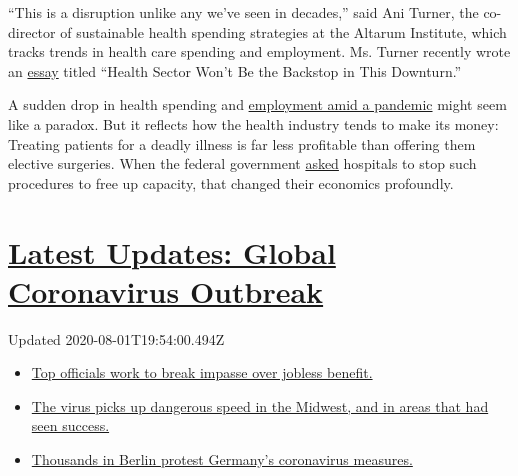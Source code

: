 ``This is a disruption unlike any we've seen in decades,'' said Ani
Turner, the co-director of sustainable health spending strategies at the
Altarum Institute, which tracks trends in health care spending and
employment. Ms. Turner recently wrote an
\href{https://altarum.org/news/health-care-sheds-43000-jobs-march-biggest-loss-least-three-decades}{essay}
titled ``Health Sector Won't Be the Backstop in This Downturn.''

A sudden drop in health spending and
\href{https://www.nytimes3xbfgragh.onion/2020/04/03/us/politics/coronavirus-health-care-workers-layoffs.html}{employment
amid a pandemic} might seem like a paradox. But it reflects how the
health industry tends to make its money: Treating patients for a deadly
illness is far less profitable than offering them elective surgeries.
When the federal government
\href{https://www.cms.gov/files/document/covid-elective-surgery-recommendations.pdf}{asked}
hospitals to stop such procedures to free up capacity, that changed
their economics profoundly.

\hypertarget{latest-updates-global-coronavirus-outbreak}{%
\section{\texorpdfstring{\href{https://www.nytimes3xbfgragh.onion/2020/08/01/world/coronavirus-covid-19.html?action=click\&pgtype=Article\&state=default\&region=MAIN_CONTENT_1\&context=storylines_live_updates}{Latest
Updates: Global Coronavirus
Outbreak}}{Latest Updates: Global Coronavirus Outbreak}}\label{latest-updates-global-coronavirus-outbreak}}

Updated 2020-08-01T19:54:00.494Z

\begin{itemize}
\tightlist
\item
  \href{https://www.nytimes3xbfgragh.onion/2020/08/01/world/coronavirus-covid-19.html?action=click\&pgtype=Article\&state=default\&region=MAIN_CONTENT_1\&context=storylines_live_updates\#link-3ac56579}{Top
  officials work to break impasse over jobless benefit.}
\item
  \href{https://www.nytimes3xbfgragh.onion/2020/08/01/world/coronavirus-covid-19.html?action=click\&pgtype=Article\&state=default\&region=MAIN_CONTENT_1\&context=storylines_live_updates\#link-8796723}{The
  virus picks up dangerous speed in the Midwest, and in areas that had
  seen success.}
\item
  \href{https://www.nytimes3xbfgragh.onion/2020/08/01/world/coronavirus-covid-19.html?action=click\&pgtype=Article\&state=default\&region=MAIN_CONTENT_1\&context=storylines_live_updates\#link-25930521}{Thousands
  in Berlin protest Germany's coronavirus measures.}
\end{itemize}

